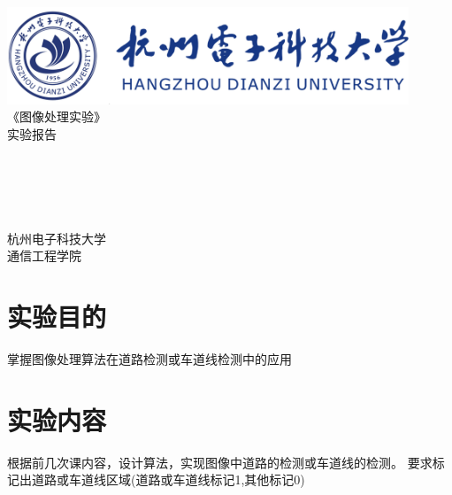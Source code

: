 \documentclass[a4paper]{ctexart}
\begin{document}
  \begin{titlepage}
      \songti
      \begin{center}
        \vspace*{1cm}
        \includegraphics[width=0.9\textwidth]{../HDU.png}\\
        \vspace*{2.5cm}
        {\fontsize{24pt}{0}
          《图像处理实验》\\
          \fontsize{36pt}{0}
          \vspace*{1cm}
          实验报告\\
        }
        \vspace*{3cm}
        {\fontsize{18pt}{0}
           \\
          \vspace*{2cm}
           \\
          \vspace*{0.5cm}
           \\
          \vspace*{0.5cm}
           \\
          \vspace*{0.5cm}
           \\
          \vspace*{5cm}
          杭州电子科技大学\\通信工程学院
        }
      \end{center}
  \end{titlepage}


  \newpage
  \section{实验目的}
    掌握图像处理算法在道路检测或车道线检测中的应用

  \section{实验内容}
    根据前几次课内容，设计算法，实现图像中道路的检测或车道线的检测。
    要求标记出道路或车道线区域(道路或车道线标记1,其他标记0)
\end{document}

